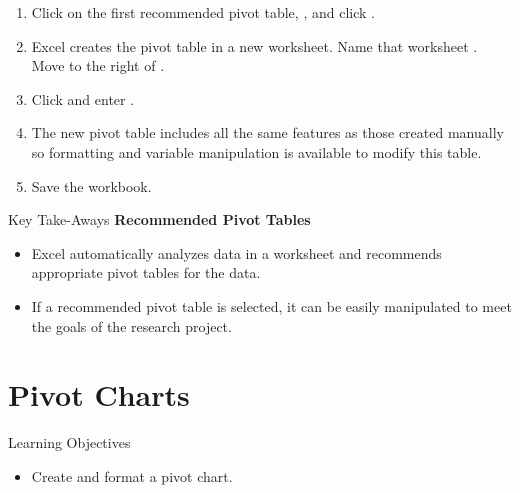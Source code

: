 \begin{enumbox}
\begin{enumerate}
		\item Click on the first recommended pivot table, , and click .
		\item Excel creates the pivot table in a new worksheet. Name that worksheet .
		Move  to the right of .
		\item Click  and enter .
		\item The new pivot table includes all the same features as those created manually so formatting and variable manipulation is available to modify this table.
		\item Save the  workbook.
	\end{enumerate}
\end{enumbox}
	
\begin{center}
	\begin{tkwbox}{Key Take-Aways}
		\textbf{Recommended Pivot Tables}
		\\
		\begin{itemize}
			\setlength{\itemsep}{0pt}
			\setlength{\parskip}{0pt}
			\setlength{\parsep}{0pt}
			
			\item Excel automatically analyzes data in a worksheet and recommends appropriate pivot tables for the data.
			\item If a recommended pivot table is selected, it can be easily manipulated to meet the goals of the research project.
			
		\end{itemize}
	\end{tkwbox}
\end{center}

\section{Pivot Charts}

\begin{center}
	\begin{objbox}{Learning Objectives}
		\begin{itemize}
			\setlength{\itemsep}{0pt}
			\setlength{\parskip}{0pt}
			\setlength{\parsep}{0pt}
			
			\item Create and format a pivot chart.
			
		\end{itemize}
	\end{objbox}
\end{center}

